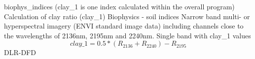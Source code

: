 %
{ %
biophys\_indices (clay\_1 is one index calculated within the overall program)
}
%
{ %
Calculation of clay ratio (clay\_1)
}
%
{ %
Biophysics - soil indices
}
%
{ %
Narrow band multi- or hyperspectral imagery (ENVI standard image data) including channels close to the wavelengths of 2136nm, 2195nm and 2240nm.\bigskip
}
%
{ %
Single band with clay\_1 values
}
%
{ %
\begin{displaymath}
clay\_1 = 0.5 * ( R_{2136} + R_{2240} ) - R_{2195}
\end{displaymath}
}
%
{ %
DLR-DFD
}
%
{ %

}
